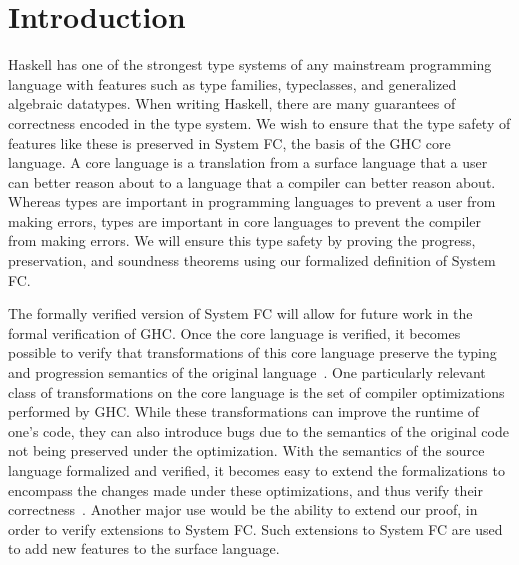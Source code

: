 \documentclass{sig-alternate}
\begin{document}
\section{Introduction}
\label{sec:intro}
Haskell has one of the strongest type systems of any mainstream programming language with features such as type families, typeclasses, and generalized algebraic datatypes. When writing Haskell, there are many guarantees of correctness encoded in the type system. We wish to ensure that the type safety of features like these is preserved in System FC, the basis of the GHC core language. A core language is a translation from a surface language that a user can better reason about to a language that a compiler can better reason about. Whereas types are important in programming languages to prevent a user from making errors, types are important in core languages to prevent the compiler from making errors. We will ensure this type safety by proving the progress, preservation, and soundness theorems using our formalized definition of System FC.



The formally verified version of System FC will allow for future work in the formal verification of GHC. Once the core language is verified, it becomes possible to verify that transformations of this core language preserve the typing and progression semantics of the original language~\cite{zhao2013formalizing}. One particularly relevant class of transformations on the core language is the set of compiler optimizations performed by GHC. While these transformations can improve the runtime of one's code, they can also introduce bugs due to the semantics of the original code not being preserved under the optimization. With the semantics of the source language formalized and verified, it becomes easy to extend the formalizations to encompass the changes made under these optimizations, and thus verify their correctness~\cite{Zhao:2012:FLI:2103656.2103709}. Another major use would be the ability to extend our proof, in order to verify extensions to System FC. Such extensions to System FC are used to add new features to the surface language.
\end{document}
